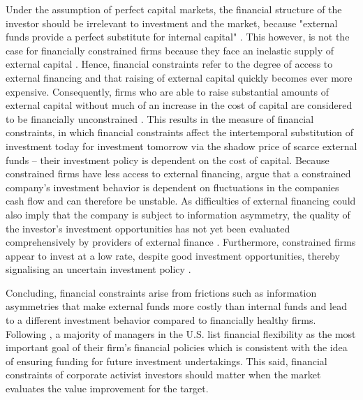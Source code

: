 \documentclass[12pt]{article}
\begin{document}
Under the assumption of perfect capital markets, the financial structure of the investor should be irrelevant to investment and the market, because "external funds provide a perfect substitute for internal capital" \citep[p. 141]{Fazzari1988}. This however, is not the case for financially constrained firms because they face an inelastic supply of external capital \citep[p.272]{Farre-Mensa2016}. Hence, financial constraints refer to the degree of access to external financing and that raising of external capital quickly becomes ever more expensive. Consequently, firms who are able to raise substantial amounts of external capital without much of an increase in the cost of capital are considered to be financially unconstrained \citep[p.272]{Farre-Mensa2016}. This results in the \citet[p.531]{Whited2006} measure of financial constraints, in which financial constraints affect the intertemporal substitution of investment today for investment tomorrow via the shadow price of scarce external funds -- their investment policy is dependent on the cost of capital. Because constrained firms have less access to external financing, \citet[p. 142]{Fazzari1988} argue that a constrained company's investment behavior is dependent on fluctuations in the companies cash flow and can therefore be unstable. As difficulties of external financing could also imply that the company is subject to information asymmetry, the quality of the investor's investment opportunities has not yet been evaluated comprehensively by providers of external finance \citep[p.142]{Fazzari1988}. Furthermore, constrained firms appear to invest at a low rate, despite good investment opportunities, thereby signalising an uncertain investment policy \citep[p.533]{Whited2006}.\par
Concluding, financial constraints arise from frictions such as information asymmetries that make external funds more costly than internal funds and lead to a different investment behavior compared to financially healthy firms. Following \citet[p.691]{Almeida2011}, a majority of managers in the U.S. list financial flexibility as the most important goal of their firm's financial policies which is consistent with the idea of ensuring funding for future investment undertakings. This said, financial constraints of corporate activist investors should matter when the market evaluates the value improvement for the target.
\end{document}
